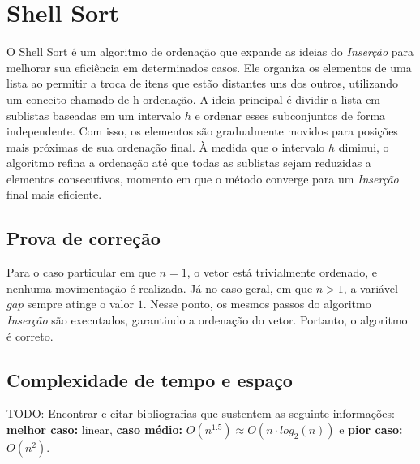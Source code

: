 \section{Shell Sort}
O Shell Sort é um algoritmo de ordenação que expande as ideias do \textit{Inserção} para melhorar sua eficiência em determinados casos. Ele organiza os elementos de uma lista ao permitir a troca de itens que estão distantes uns dos outros, utilizando um conceito chamado de h-ordenação. A ideia principal é dividir a lista em sublistas baseadas em um intervalo $h$ e ordenar esses subconjuntos de forma independente. Com isso, os elementos são gradualmente movidos para posições mais próximas de sua ordenação final. À medida que o intervalo $h$ diminui, o algoritmo refina a ordenação até que todas as sublistas sejam reduzidas a elementos consecutivos, momento em que o método converge para um \textit{Inserção} final mais eficiente.



\subsection{Prova de correção}
Para o caso particular em que $n = 1$, o vetor está trivialmente ordenado, e nenhuma movimentação é realizada. Já no caso geral, em que $n > 1$, a variável $gap$ sempre atinge o valor $1$. Nesse ponto, os mesmos passos do algoritmo \textit{Inserção} são executados, garantindo a ordenação do vetor. Portanto, o algoritmo é correto.

\subsection{Complexidade de tempo e espaço}
TODO: Encontrar e citar bibliografias que sustentem as seguinte informações: \textbf{melhor caso:} linear, \textbf{caso médio:} $O(n^{1.5}) \approx O(n \cdot log_2(n))$ e \textbf{pior caso:} $O(n^2)$.
